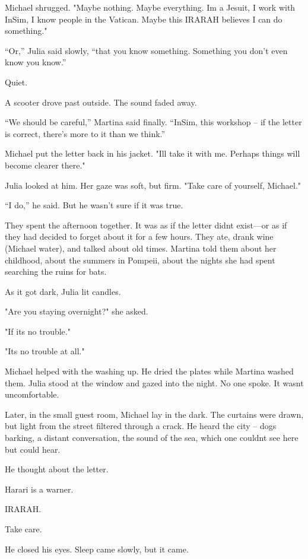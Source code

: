 \documentclass[
]{article}
\begin{document}
Michael shrugged. "Maybe nothing. Maybe everything. I\textquotesingle m a Jesuit, I work with InSim, I know people in the Vatican. Maybe this IRARAH believes I can do something."

``Or,'' Julia said slowly, ``that you know something. Something you don't even know you know.''

Quiet.

A scooter drove past outside. The sound faded away.

``We should be careful,'' Martina said finally. ``InSim, this workshop -- if the letter is correct, there's more to it than we think.''

Michael put the letter back in his jacket. "I\textquotesingle ll take it with me. Perhaps things will become clearer there."

Julia looked at him. Her gaze was soft, but firm. "Take care of yourself, Michael."

``I do,'' he said. But he wasn't sure if it was true.

They spent the afternoon together. It was as if the letter didn\textquotesingle t exist---or as if they had decided to forget about it for a few hours. They ate, drank wine (Michael water), and talked about old times. Martina told them about her childhood, about the summers in Pompeii, about the nights she had spent searching the ruins for bats.

As it got dark, Julia lit candles.

"Are you staying overnight?" she asked.

"If it\textquotesingle s no trouble."

"It\textquotesingle s no trouble at all."

Michael helped with the washing up. He dried the plates while Martina washed them. Julia stood at the window and gazed into the night. No one spoke. It wasn\textquotesingle t uncomfortable.

Later, in the small guest room, Michael lay in the dark. The curtains were drawn, but light from the street filtered through a crack. He heard the city -- dogs barking, a distant conversation, the sound of the sea, which one couldn\textquotesingle t see here but could hear.

He thought about the letter.

Harari is a warner.

IRARAH.

Take care.

He closed his eyes. Sleep came slowly, but it came.
\end{document}
